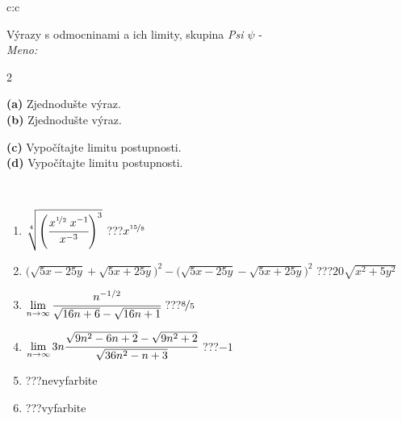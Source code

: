 \documentclass[10pt]{report}
\begin{document}
\begin{tabular}{c:c}
\begin{minipage}[c][104.5mm][t]{0.5\linewidth}
\begin{center}
\vspace{7mm}
{\huge {\Large Výrazy s odmocninami a ich limity}, skupina \textit{Psi $\psi$} -}\\[5mm]
\textit{Meno:}\phantom{xxxxxxxxxxxxxxxxxxxxxxxxxxxxxxxxxxxxxxxxxxxxxxxxxxxxxxxxxxxxxxxxx}\\[5mm]
\begin{minipage}{0.95\linewidth}
\begin{center}
{\small \begin{multicols}{2} \raggedright
\phantom{xxxxxxxxx}\textbf{(a)} Zjednodušte výraz. \\[1mm]
\phantom{xxxxxxxxx}\textbf{(b)} Zjednodušte výraz. \par \columnbreak
\textbf{(c)} Vypočítajte limitu postupnosti. \\[1mm]
\textbf{(d)} Vypočítajte limitu postupnosti.
\end{multicols}
}
\end{center}
\end{minipage}
\\[4mm]
\begin{minipage}{0.79\linewidth}
\begin{center}
\begin{varwidth}{\linewidth}
\begin{enumerate}
\small
\item $\sqrt[4]{\left(\cfrac{x^{\nicefrac{1}{2}}\;x^{-1}}{x^{-3}}\right)^{3}}$\quad \dotfill\; ???\;\dotfill \quad $x^{\nicefrac{15}{8}}$
\item {\footnotesize{\scriptsize$\big(\sqrt{5x-25y}+\sqrt{5x+25y}\big)^2-\big(\sqrt{5x-25y}-\sqrt{5x+25y}\big)^2$}\quad \dotfill\; ???\;\dotfill \quad $20\sqrt{x^2+5y^2}$}
\item $\lim\limits_{n\to\infty}\cfrac{n^{-1/2}}{\sqrt{16n+6}-\sqrt{16n+1}}$\quad \dotfill\; ???\;\dotfill \quad $\nicefrac{8}{5}$
\item $\lim\limits_{n\to\infty}3n\cfrac{\sqrt{9n^2-6n+2}-\sqrt{9n^2+2}}{\sqrt{36n^2-n+3}}$\quad \dotfill\; ???\;\dotfill \quad $-1$
\item \quad \dotfill\; ???\;\dotfill \quad nevyfarbite
\item \quad \dotfill\; ???\;\dotfill \quad vyfarbite
\end{enumerate}
\end{varwidth}
\end{center}

\end{minipage}
\end{center}
\end{minipage}
\end{tabular}
\end{document}
